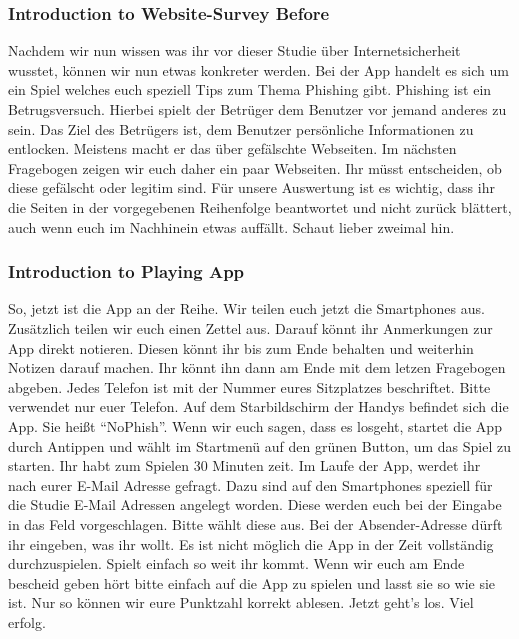 \subsubsection{Introduction to Website-Survey Before}
Nachdem wir nun wissen was ihr vor dieser Studie {\"u}ber Internetsicherheit wusstet, k{\"o}nnen wir nun etwas konkreter werden.
Bei der App handelt es sich um ein Spiel welches euch speziell Tips zum Thema Phishing gibt.
Phishing ist ein Betrugsversuch. Hierbei spielt der Betr{\"u}ger dem Benutzer vor jemand anderes zu sein. Das Ziel des Betr{\"u}gers ist, dem Benutzer pers{\"o}nliche Informationen zu entlocken. Meistens macht er das {\"u}ber gef{\"a}lschte Webseiten.
\newline
\newline
Im n{\"a}chsten Fragebogen zeigen wir euch daher ein paar Webseiten. Ihr m{\"u}sst entscheiden, ob diese gef{\"a}lscht oder legitim sind.
F{\"u}r unsere Auswertung ist es wichtig, dass ihr die Seiten in der vorgegebenen Reihenfolge beantwortet und nicht zur{\"u}ck bl{\"a}ttert, auch wenn euch im Nachhinein etwas auff{\"a}llt. Schaut lieber zweimal hin.

\subsubsection{Introduction to Playing App}
So, jetzt ist die App an der Reihe.
Wir teilen euch jetzt die Smartphones aus.
Zus{\"a}tzlich teilen wir euch einen Zettel aus. Darauf k{\"o}nnt ihr Anmerkungen zur App direkt notieren.
Diesen k{\"o}nnt ihr bis zum Ende behalten und weiterhin Notizen darauf machen. Ihr k{\"o}nnt ihn dann am Ende mit dem letzen Fragebogen abgeben.
\newline
\newline
Jedes Telefon ist mit der Nummer eures Sitzplatzes beschriftet. Bitte verwendet nur euer Telefon.
Auf dem Starbildschirm der Handys befindet sich die App. Sie hei{\ss}t ``NoPhish''.
Wenn wir euch sagen, dass es losgeht, startet die App durch Antippen und w{\"a}hlt im Startmen{\"u} auf den gr{\"u}nen Button, um das Spiel zu starten.
Ihr habt zum Spielen 30 Minuten zeit.
\newline
\newline
Im Laufe der App, werdet ihr nach eurer E-Mail Adresse gefragt. Dazu sind auf den Smartphones speziell f{\"u}r die Studie E-Mail Adressen angelegt worden. Diese werden euch bei der Eingabe in das Feld vorgeschlagen. Bitte w{\"a}hlt diese aus. Bei der Absender-Adresse d{\"u}rft ihr eingeben, was ihr wollt.
\newline
\newline
Es ist nicht m{\"o}glich die App in der Zeit vollst{\"a}ndig durchzuspielen. Spielt einfach so weit ihr kommt.
Wenn wir euch am Ende bescheid geben h{\"o}rt bitte einfach auf die App zu spielen und lasst sie so wie sie ist. Nur so k{\"o}nnen wir eure Punktzahl korrekt ablesen.
Jetzt geht's los. Viel erfolg.


